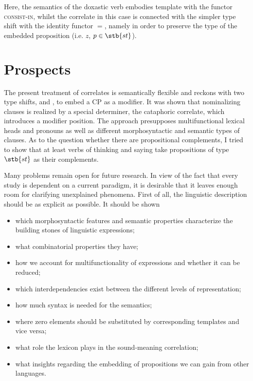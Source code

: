 \documentclass[output=paper,
colorlinks,
citecolor=brown,
newtxmath
]{langscibook}
\begin{document}
\noindent Here, the semantics of the doxastic verb embodies template  with the functor \textsc{consist-in}, whilst the correlate in this case is connected with the simpler type shift  with the identity functor $=$, namely in order to preserve the type of the embedded proposition (i.e. $z$, $p \in \stb{st}$).


\section{Prospects}\label{s:3}

The present treatment of correlates is semantically flexible and reckons with two type shifts,  and , to embed a CP as a modifier. It was shown that nominalizing clauses is realized by a special determiner, the cataphoric correlate, which introduces a modifier position. The approach presupposes multifunctional lexical heads and pronouns as well as different morphosyntactic and semantic types of clauses. As to the question whether there are propositional complements, I tried to show that at least verbs of thinking and saying take propositions of type $\stb{st}$ as their complements.

Many problems remain open for future research. In view of the fact that every study is dependent on a current paradigm, it is desirable that it leaves enough room for clarifying unexplained phenomena. First of all, the linguistic description should be as explicit as possible. It should be shown

\begin{itemize}
    \item which morphosyntactic features and semantic properties characterize the building stones of linguistic expressions;
    \item what combinatorial properties they have;
    \item how we account for multifunctionality of expressions and whether it can be reduced;
    \item which interdependencies exist between the different levels of representation;
    \item how much syntax is needed for the semantics;
    \item where zero elements should be substituted by corresponding templates and vice versa;
    \item what role the lexicon plays in the sound-meaning correlation;
    \item what insights regarding the embedding of propositions we can gain from other languages.
\end{itemize}
\end{document}
